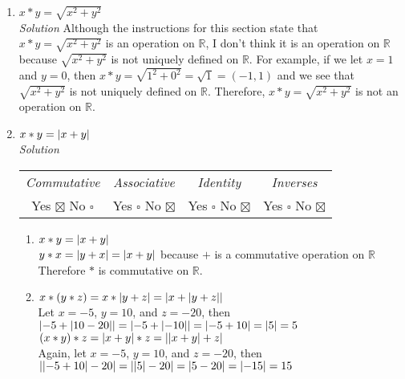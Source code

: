 \documentclass[12pt]{article}
\DeclarePairedDelimiter{\abs}{\lvert}{\rvert}
\begin{document}
        \begin{enumerate}
          \item $x * y = \sqrt{x^2 + y^2}$ \\
            \medskip
            \textit{Solution}
            Although the instructions for this section state that $x * y = \sqrt{x^2 + y^2}$ is an operation
            on $\mathbb{R}$, I don't think it is an operation on  $\mathbb{R}$ because $\sqrt{x^2 + y^2}$ is 
            not uniquely defined on $\mathbb{R}$. For example, if we let $x = 1$ and $y = 0$, then 
            $x * y = \sqrt{1^2 + 0^2} = \sqrt{1} = (-1, 1)$ and we see that $\sqrt{x^2 + y^2}$ is not uniquely 
            defined on $\mathbb{R}$. Therefore, $x * y = \sqrt{x^2 + y^2}$ is not an operation on $\mathbb{R}$. \\
          \item $x * y = \abs{ x + y }$ \\
            \medskip
            \textit{Solution}
            \medskip
              \begin{tabular}{c c c c}
                \textit{Commutative} & \textit{Associative} & \textit{Identity} & \textit{Inverses} \\
                Yes $\boxtimes$ No $\square$ & Yes $\square$ No $\boxtimes$ & Yes $\square$ No $\boxtimes$ & Yes $\square$ No $\boxtimes$  \\
              \end{tabular}
              \begin{enumerate} 
                \item $x * y = \abs{x + y}$ \\
                  $y * x = \abs{y + x} = \abs{x + y}$  because $+$ is a commutative operation on $\mathbb{R}$ \\
                  Therefore $*$ is commutative on $\mathbb{R}$.
                \item 
                  $x * (y * z) = x * \abs{y + z} = \abs{x + \abs{y + z}}$ \\
                  Let $x = -5$, $ y = 10$, and $z = -20$, then \\
                  $\abs{-5 + \abs{10-20}} = \abs{-5 + \abs{-10}} = \abs{-5 + 10} = \abs{5} = 5$ \\
                  $(x * y) * z = \abs{x + y} * z = \abs{\abs{x + y} + z}$ \\
                  Again, let $x = -5$, $ y = 10$, and $z = -20$, then \\
                  $\abs{\abs{-5 + 10}-20} = \abs{\abs{5}-20} = \abs{5-20} = \abs{-15} = 15$ \\

\end{enumerate}
\end{enumerate}
\end{document}
